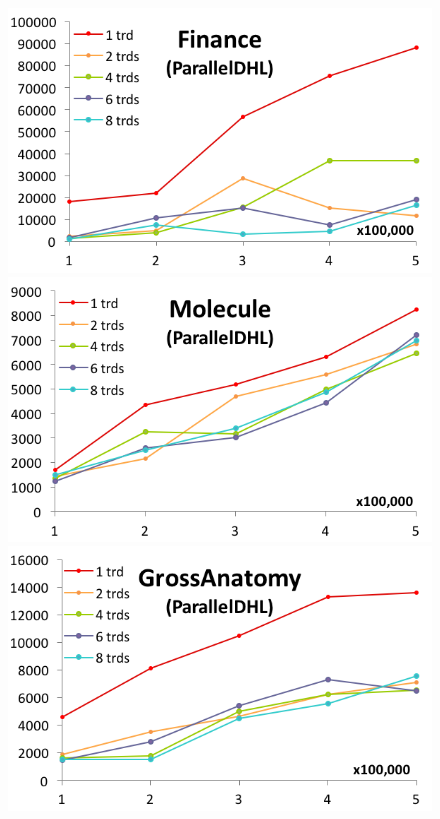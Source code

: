 \begin{figure}[htbp]
  \centering
  \begin{minipage}{.24\textwidth}
    \includegraphics[width=\textwidth]{experimentalResults/1-Finance-simple}
  \end{minipage}
  \begin{minipage}{.24\textwidth}
    \includegraphics[width=\textwidth]{experimentalResults/2-molecule-simple}
  \end{minipage}
  \begin{minipage}{.24\textwidth}
    \includegraphics[width=\textwidth]{experimentalResults/3-NIF_GrossAnatomy-simple}

\end{minipage}
\end{figure}
